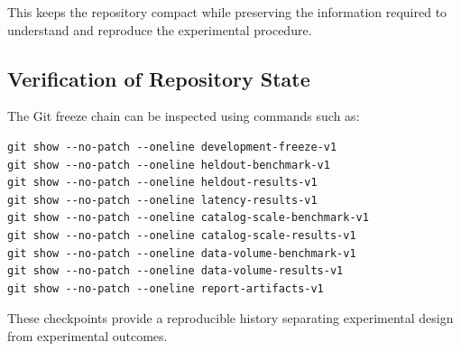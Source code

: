 This keeps the repository compact while preserving the information required to
understand and reproduce the experimental procedure.


\subsection{Verification of Repository State}

The Git freeze chain can be inspected using commands such as:

\begin{verbatim}
git show --no-patch --oneline development-freeze-v1
git show --no-patch --oneline heldout-benchmark-v1
git show --no-patch --oneline heldout-results-v1
git show --no-patch --oneline latency-results-v1
git show --no-patch --oneline catalog-scale-benchmark-v1
git show --no-patch --oneline catalog-scale-results-v1
git show --no-patch --oneline data-volume-benchmark-v1
git show --no-patch --oneline data-volume-results-v1
git show --no-patch --oneline report-artifacts-v1
\end{verbatim}

These checkpoints provide a reproducible history separating experimental
design from experimental outcomes.
